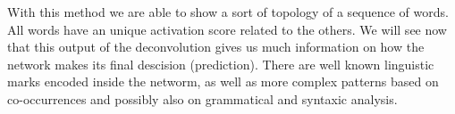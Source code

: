 With this method we are able to show a sort of topology of a sequence of words. All words have an unique activation score related to the others. We will see now that this output of the deconvolution gives us much information on how the network makes its final descision (prediction). There are well known linguistic marks encoded inside the networm, as well as more complex patterns based on co-occurrences and possibly also on grammatical and syntaxic analysis.
